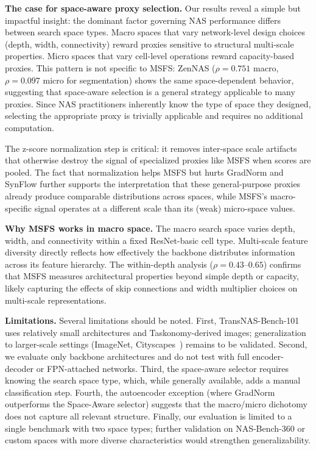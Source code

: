 \documentclass[10pt,twocolumn,letterpaper]{article}
\begin{document}
\textbf{The case for space-aware proxy selection.}
Our results reveal a simple but impactful insight: the dominant factor governing NAS performance differs between search space types.
Macro spaces that vary network-level design choices (depth, width, connectivity) reward proxies sensitive to structural multi-scale properties.
Micro spaces that vary cell-level operations reward capacity-based proxies.
This pattern is not specific to MSFS: ZenNAS ($\rho{=}0.751$ macro, $\rho{=}0.097$ micro for segmentation) shows the same space-dependent behavior, suggesting that space-aware selection is a general strategy applicable to many proxies.
Since NAS practitioners inherently know the type of space they designed, selecting the appropriate proxy is trivially applicable and requires no additional computation.

The z-score normalization step is critical: it removes inter-space scale artifacts that otherwise destroy the signal of specialized proxies like MSFS when scores are pooled.
The fact that normalization helps MSFS but hurts GradNorm and SynFlow further supports the interpretation that these general-purpose proxies already produce comparable distributions across spaces, while MSFS's macro-specific signal operates at a different scale than its (weak) micro-space values.

\textbf{Why MSFS works in macro space.}
The macro search space varies depth, width, and connectivity within a fixed ResNet-basic cell type.
Multi-scale feature diversity directly reflects how effectively the backbone distributes information across its feature hierarchy.
The within-depth analysis ($\rho{=}0.43$--$0.65$) confirms that MSFS measures architectural properties beyond simple depth or capacity, likely capturing the effects of skip connections and width multiplier choices on multi-scale representations.

\textbf{Limitations.}
Several limitations should be noted.
First, TransNAS-Bench-101 uses relatively small architectures and Taskonomy-derived images; generalization to larger-scale settings (ImageNet, Cityscapes~\cite{cordts2016cityscapes}) remains to be validated.
Second, we evaluate only backbone architectures and do not test with full encoder-decoder or FPN-attached networks.
Third, the space-aware selector requires knowing the search space type, which, while generally available, adds a manual classification step.
Fourth, the autoencoder exception (where GradNorm outperforms the Space-Aware selector) suggests that the macro/micro dichotomy does not capture all relevant structure.
Finally, our evaluation is limited to a single benchmark with two space types; further validation on NAS-Bench-360 or custom spaces with more diverse characteristics would strengthen generalizability.
\end{document}
